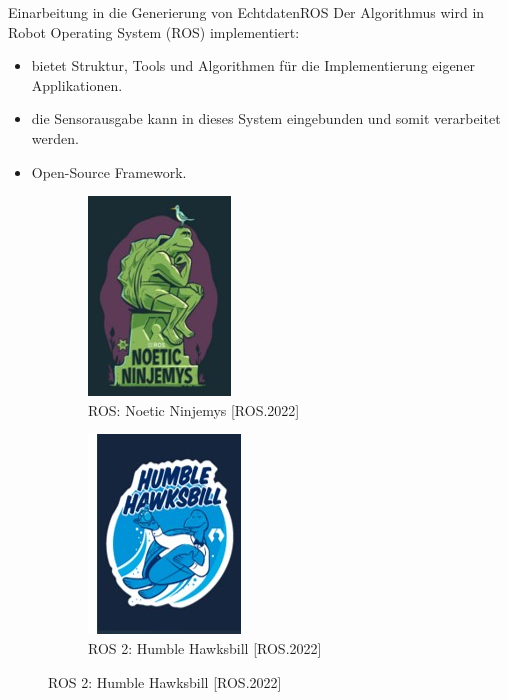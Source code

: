\documentclass[169, handout	]{THIbeamer} %
\begin{document}
	\begin{frame}{Einarbeitung in die Generierung von Echtdaten}{ROS}			
		Der Algorithmus wird in Robot Operating System (ROS) implementiert:
		\begin{itemize}
			\item bietet Struktur, Tools und Algorithmen für die Implementierung eigener Applikationen.
			\item die Sensorausgabe kann in dieses System eingebunden und somit verarbeitet werden.
			\item Open-Source Framework.
		\end{itemize}		
		\begin{figure}
			\centering
    		\begin{subfigure}[b]{0.4\textwidth}
				\includegraphics[scale=0.3]{required/ROS.jpg}
				\caption{ROS: Noetic Ninjemys [ROS.2022]}
        		\label{ROS}
   		 	\end{subfigure}
    		\begin{subfigure}[b]{0.4\textwidth}
				\includegraphics[scale=0.3]{required/ROS2.jpg}
				\caption{ROS 2: Humble Hawksbill [ROS.2022]}
        		\label{ROS}
    		\end{subfigure}
		\end{figure}			
	\end{frame}
\end{document}

